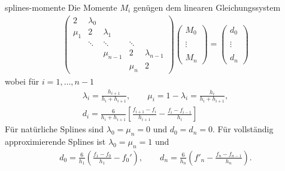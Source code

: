 \begin{Lemma}{splines-momente}
  Die Momente $M_i$ genügen dem linearen Gleichungssystem
  \begin{gather}
    \begin{pmatrix}
      2 & \lambda_0 \\
      \mu_1 & 2 & \lambda_1\\
      & \ddots & \ddots & \ddots \\
      && \mu_{n-1} & 2 & \lambda_{n-1}\\
      &&&\mu_n & 2
    \end{pmatrix}
    \begin{pmatrix}
      M_0\\\\\vdots\\\\M_n
    \end{pmatrix}
    =
    \begin{pmatrix}
      d_0\\\\\vdots\\\\d_n
    \end{pmatrix}
  \end{gather}
  wobei für $i=1,\dots,n-1$
  \begin{gather}
    \lambda_i = \tfrac{h_{i+1}}{h_{i}+h_{i+1}},
    \qquad \mu_i = 1-\lambda_i = \tfrac{h_{i}}{h_{i}+h_{i+1}},\\
    d_i = \tfrac{6}{h_{i}+h_{i+1}}
    \left[\tfrac{f_{i+1}-f_i}{h_{i+1}} - \tfrac{f_{i}-f_{i-1}}{h_{i}}\right]
  \end{gather}
  Für natürliche Splines sind $\lambda_0 = \mu_n =0$ und $d_0 = d_n = 0$.
  Für vollständig approximierende Splines ist $\lambda_0 = \mu_n = 1$ und
  \begin{gather}
    d_0 = \frac{6}{h_1}\left(\frac{f_1-f_0}{h_1}-f_0'\right),
    \qquad
    d_n = \frac{6}{h_n}\left(f'_n - \frac{f_n-f_{n-1}}{h_n}\right).
  \end{gather}
\end{Lemma}

